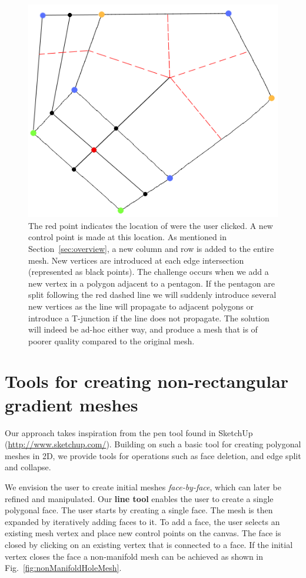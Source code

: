\documentclass{egpubl}
\begin{document}
	\begin{figure}[t]
		\centering
		\includegraphics[height=0.25\textheight]{pentagonMesh.png}
		\caption{The red point indicates the location of were the user clicked. A new control point is made at this location. As mentioned in Section~\ref{sec:overview}, a new column and row is added to the entire mesh. New vertices are introduced at each edge intersection (represented as black points). The challenge occurs when we add a new vertex in a polygon adjacent to a pentagon. If the pentagon are split following the red dashed line we will suddenly introduce several new vertices as the line will propagate to adjacent polygons or introduce a T-junction if the line does not propagate. The solution will indeed be ad-hoc either way, and produce a mesh that is of poorer quality compared to the original mesh.
		}
		\label{fig:adHocPentagon}
	\end{figure}
	
	\section{Tools for creating non-rectangular gradient meshes}
	\label{sec:method}
	
	Our approach takes inspiration from the pen tool found in SketchUp (\url{http://www.sketchup.com/}). Building on such a basic tool for creating polygonal meshes in 2D, we provide tools for operations such as face deletion, and edge split and collapse.
	
	We envision the user to create initial meshes \textit{face-by-face}, which can later be refined and manipulated. Our \textbf{line tool} enables the user to create a single polygonal face. The user starts by creating a single face. The mesh is then expanded by iteratively adding faces to it. To add a face, the user selects an existing mesh vertex and place new control points on the canvas. The face is closed by clicking on an existing vertex that is connected to a face. If the initial vertex closes the face a non-manifold mesh can be achieved as shown in Fig.~\ref{fig:nonManifoldHoleMesh}.
	
\end{document}
